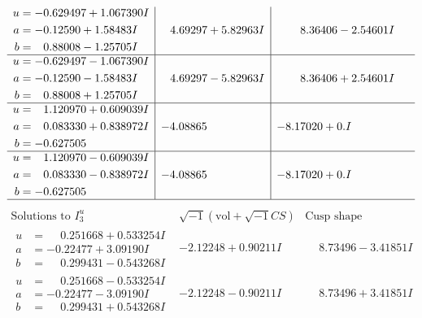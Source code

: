 \documentclass[1p]{elsarticle_modified}
\theoremstyle{definition}
\newcommand{\I}{\sqrt{-1}}
\begin{document}
$$\begin{array}{c|c|c}
\begin{aligned}
u &= -0.629497 + 1.067390 I \\
a &= -0.12590 + 1.58483 I \\
b &= \phantom{-}0.88008 - 1.25705 I\end{aligned}
 & \phantom{-}4.69297 + 5.82963 I & \phantom{-}8.36406 - 2.54601 I \\ \hline\begin{aligned}
u &= -0.629497 - 1.067390 I \\
a &= -0.12590 - 1.58483 I \\
b &= \phantom{-}0.88008 + 1.25705 I\end{aligned}
 & \phantom{-}4.69297 - 5.82963 I & \phantom{-}8.36406 + 2.54601 I \\ \hline\begin{aligned}
u &= \phantom{-}1.120970 + 0.609039 I \\
a &= \phantom{-}0.083330 + 0.838972 I \\
b &= -0.627505\phantom{ +0.000000I}\end{aligned}
 & -4.08865\phantom{ +0.000000I} & -8.17020 + 0. I\phantom{ +0.000000I} \\ \hline\begin{aligned}
u &= \phantom{-}1.120970 - 0.609039 I \\
a &= \phantom{-}0.083330 - 0.838972 I \\
b &= -0.627505\phantom{ +0.000000I}\end{aligned}
 & -4.08865\phantom{ +0.000000I} & -8.17020 + 0. I\phantom{ +0.000000I}\\
 \hline 
 \end{array}$$\newpage$$\begin{array}{c|c|c}  
\text{Solutions to }I^u_{3}& \I (\text{vol} + \sqrt{-1}CS) & \text{Cusp shape}\\
 \hline 
\begin{aligned}
u &= \phantom{-}0.251668 + 0.533254 I \\
a &= -0.22477 + 3.09190 I \\
b &= \phantom{-}0.299431 - 0.543268 I\end{aligned}
 & -2.12248 + 0.90211 I & \phantom{-}8.73496 - 3.41851 I \\ \hline\begin{aligned}
u &= \phantom{-}0.251668 - 0.533254 I \\
a &= -0.22477 - 3.09190 I \\
b &= \phantom{-}0.299431 + 0.543268 I\end{aligned}
 & -2.12248 - 0.90211 I & \phantom{-}8.73496 + 3.41851 I \\ \hline\begin{aligned}

\end{aligned}
\end{array}$$
\end{document}
